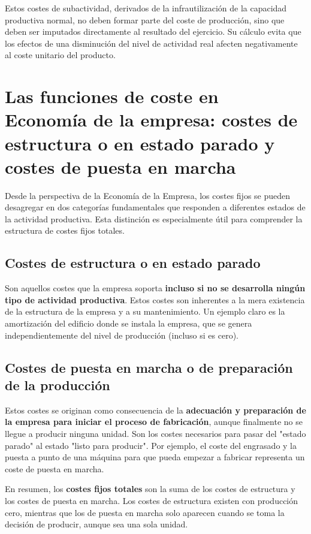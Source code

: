 Estos costes de subactividad, derivados de la infrautilización de la capacidad productiva normal, no deben formar parte del coste de producción, sino que deben ser imputados directamente al resultado del ejercicio. Su cálculo evita que los efectos de una disminución del nivel de actividad real afecten negativamente al coste unitario del producto.

\section{Las funciones de coste en Economía de la empresa: costes de estructura o en estado parado y costes de puesta en marcha}

Desde la perspectiva de la Economía de la Empresa, los costes fijos se pueden desagregar en dos categorías fundamentales que responden a diferentes estados de la actividad productiva. Esta distinción es especialmente útil para comprender la estructura de costes fijos totales.

\subsection{Costes de estructura o en estado parado}
Son aquellos costes que la empresa soporta \textbf{incluso si no se desarrolla ningún tipo de actividad productiva}. Estos costes son inherentes a la mera existencia de la estructura de la empresa y a su mantenimiento. Un ejemplo claro es la amortización del edificio donde se instala la empresa, que se genera independientemente del nivel de producción (incluso si es cero).

\subsection{Costes de puesta en marcha o de preparación de la producción}
Estos costes se originan como consecuencia de la \textbf{adecuación y preparación de la empresa para iniciar el proceso de fabricación}, aunque finalmente no se llegue a producir ninguna unidad. Son los costes necesarios para pasar del "estado parado" al estado "listo para producir". Por ejemplo, el coste del engrasado y la puesta a punto de una máquina para que pueda empezar a fabricar representa un coste de puesta en marcha.

En resumen, los \textbf{costes fijos totales} son la suma de los costes de estructura y los costes de puesta en marcha. Los costes de estructura existen con producción cero, mientras que los de puesta en marcha solo aparecen cuando se toma la decisión de producir, aunque sea una sola unidad.

